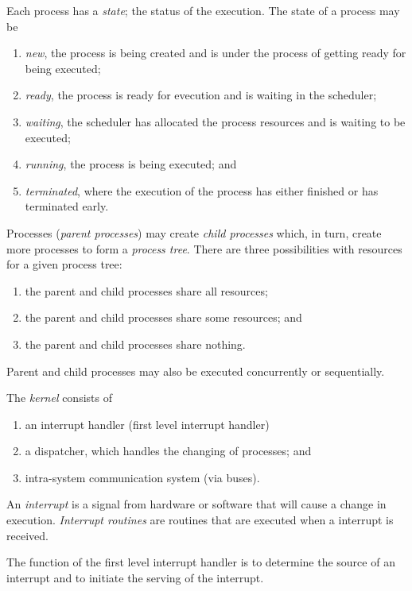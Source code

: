 Each process has a \emph{state}; the status of the execution.
The state of a process may be
\begin{enumerate}
	\item \emph{new}, the process is being created and is under the process
	of getting ready for being executed;
	\item \emph{ready}, the process is ready for evecution and is waiting in
	the scheduler;
	\item \emph{waiting}, the scheduler has allocated the process resources
	and is waiting to be executed;
	\item \emph{running}, the process is being executed; and
	\item \emph{terminated}, where the execution of the process has either 
	finished or has terminated early.
\end{enumerate}
Processes (\emph{parent processes}) may create \emph{child processes}
which, in turn, create more processes to form a \emph{process tree}.
There are three possibilities with resources for a given process tree:
\begin{enumerate}
	\item the parent and child processes share all resources;
	\item the parent and child processes share some resources; and
	\item the parent and child processes share nothing.
\end{enumerate}
Parent and child processes may also be executed concurrently or sequentially.

\begin{definition}[Kernel]
	The \emph{kernel} consists of
	\begin{enumerate}
		\item an interrupt handler (first level interrupt handler)
		\item a dispatcher, which handles the changing of processes; and
		\item intra-system communication system (via buses).
	\end{enumerate}
\end{definition}

An \emph{interrupt} is a signal from hardware or software that will cause a
change in execution. \emph{Interrupt routines} are routines that are executed
when a interrupt is received.

The function of the first level interrupt handler is to determine the source
of an interrupt and to initiate the serving of the interrupt.

